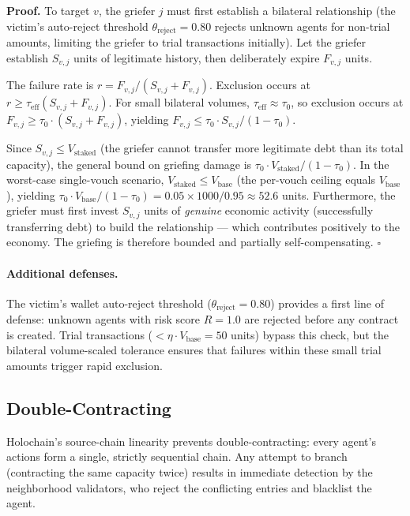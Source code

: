 \documentclass[11pt]{article}
\newcommand{\qed}{\hfill}
\newenvironment{proof}{\noindent\textbf{Proof.}}{\qed$\square$\par\medskip}
\begin{document}
\begin{proof}
To target $v$, the griefer $j$ must first establish a bilateral relationship (the victim's auto-reject threshold $\theta_{\text{reject}} = 0.80$ rejects unknown agents for non-trial amounts, limiting the griefer to trial transactions initially). Let the griefer establish $S_{v,j}$ units of legitimate history, then deliberately expire $F_{v,j}$ units.

The failure rate is $r = F_{v,j} / (S_{v,j} + F_{v,j})$. Exclusion occurs at $r \geq \tau_{\text{eff}}(S_{v,j} + F_{v,j})$. For small bilateral volumes, $\tau_{\text{eff}} \approx \tau_0$, so exclusion occurs at $F_{v,j} \geq \tau_0 \cdot (S_{v,j} + F_{v,j})$, yielding $F_{v,j} \leq \tau_0 \cdot S_{v,j} / (1 - \tau_0)$.

Since $S_{v,j} \leq V_{\text{staked}}$ (the griefer cannot transfer more legitimate debt than its total capacity), the general bound on griefing damage is $\tau_0 \cdot V_{\text{staked}} / (1 - \tau_0)$. In the worst-case single-vouch scenario, $V_{\text{staked}} \leq V_{\text{base}}$ (the per-vouch ceiling equals $V_{\text{base}}$), yielding $\tau_0 \cdot V_{\text{base}} / (1 - \tau_0) = 0.05 \times 1000 / 0.95 \approx 52.6$ units. Furthermore, the griefer must first invest $S_{v,j}$ units of \emph{genuine} economic activity (successfully transferring debt) to build the relationship --- which contributes positively to the economy. The griefing is therefore bounded and partially self-compensating. \qed
\end{proof}

\paragraph{Additional defenses.} The victim's wallet auto-reject threshold ($\theta_{\text{reject}} = 0.80$) provides a first line of defense: unknown agents with risk score $R = 1.0$ are rejected before any contract is created. Trial transactions ($< \eta \cdot V_{\text{base}} = 50$ units) bypass this check, but the bilateral volume-scaled tolerance ensures that failures within these small trial amounts trigger rapid exclusion.

\subsection{Double-Contracting}

\sloppy Holochain's source-chain linearity prevents double-contracting: every agent's actions form a single, strictly sequential chain. Any attempt to branch (contracting the same capacity twice) results in immediate detection by the neighborhood validators, who reject the conflicting entries and blacklist the agent.
\end{document}
